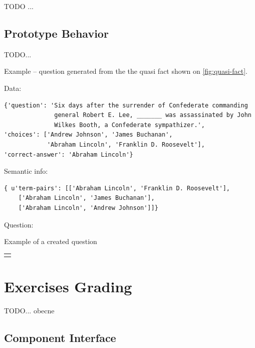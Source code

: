 \documentclass[a4paper, 12pt, twoside]{fithesis2}		%
\renewcommand{\_}{\leavevmode \kern0.0em\vbox{\hrule width0.4em}}
\newcounter{choice}
\renewcommand\thechoice{\Alph{choice}}
\newcommand\choicelabel{\thechoice.}
\newenvironment{choices}%
  {\vspace{0.8em}\list{\choicelabel}%
     {\usecounter{choice}\def\makelabel##1{\hss\llap{##1}}%
       \settowidth{\leftmargin}{W.\hskip\labelsep\hskip 0.01em}%
       \def\choice{%
         \item
       } %
       \labelwidth\leftmargin\advance\labelwidth-\labelsep
       \topsep=0pt
       \partopsep=0pt
     }%
  }%
  {\vspace{-0.7em}\endlist}
\newenvironment{question}
{
  \begin{center}
  \begin{tabular}{p{0.9\textwidth}}
  \vskip 0.05em
}
{
  \\
  \end{tabular}
  \end{center}
}
\newcommand{\sentenceGap}{\rule{1.5cm}{0.4pt}~}
\begin{document}
TODO ...

\subsection{Prototype Behavior}

TODO...


Example -- question generated from the the quasi fact shown on \autoref{fig:quasi-fact}.

Data:

\begin{verbatim}
{'question': 'Six days after the surrender of Confederate commanding
              general Robert E. Lee, _______ was assassinated by John
              Wilkes Booth, a Confederate sympathizer.',
'choices': ['Andrew Johnson', 'James Buchanan',
            'Abraham Lincoln', 'Franklin D. Roosevelt'],
'correct-answer': 'Abraham Lincoln'}
\end{verbatim}

Semantic info:

\begin{verbatim}
{ u'term-pairs': [['Abraham Lincoln', 'Franklin D. Roosevelt'],
    ['Abraham Lincoln', 'James Buchanan'],
    ['Abraham Lincoln', 'Andrew Johnson']]}
\end{verbatim}

Question:

\begin{exercise}
\caption{Example of a created question}
  \begin{question}
  Six days after the surrender of Confederate commanding general Robert E. Lee
  \sentenceGap
  was assassinated by John Wilkes Booth, a Confederate sympathizer.

  \begin{choices}
    \choice Andrew Johnson
    \choice James Buchanan
    \choice Abraham Lincoln
    \choice Franklin D. Roosevelt
  \end{choices}
  \end{question}
\end{exercise}

\section{Exercises Grading}
\label{sec:smartoo-exercises-grading}

TODO... obecne

\subsection{Component Interface}
\end{document}
